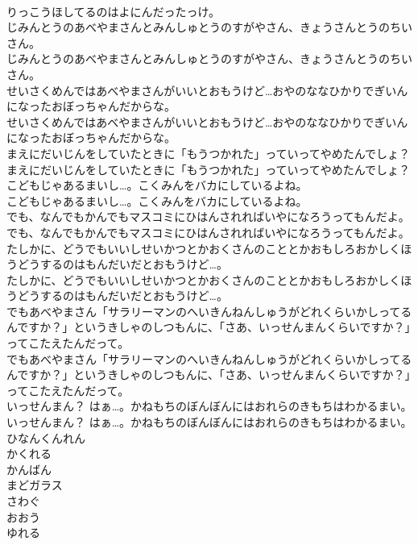 \documentclass[8pt]{extreport}
\begin{document}
\begin{CJK}{UTF8}{min}
\\	りっこうほしてるのはよにんだったっけ。
\\	じみんとうのあべやまさんとみんしゅとうのすがやさん、きょうさんとうのちいさん。
\\	じみんとうのあべやまさんとみんしゅとうのすがやさん、きょうさんとうのちいさん。
\\	せいさくめんではあべやまさんがいいとおもうけど…おやのななひかりでぎいんになったおぼっちゃんだからな。
\\	せいさくめんではあべやまさんがいいとおもうけど…おやのななひかりでぎいんになったおぼっちゃんだからな。
\\	まえにだいじんをしていたときに「もうつかれた」っていってやめたんでしょ？
\\	まえにだいじんをしていたときに「もうつかれた」っていってやめたんでしょ？
\\	こどもじゃあるまいし…。こくみんをバカにしているよね。
\\	こどもじゃあるまいし…。こくみんをバカにしているよね。
\\	でも、なんでもかんでもマスコミにひはんされればいやになろうってもんだよ。
\\	でも、なんでもかんでもマスコミにひはんされればいやになろうってもんだよ。
\\	たしかに、どうでもいいしせいかつとかおくさんのこととかおもしろおかしくほうどうするのはもんだいだとおもうけど…。
\\	たしかに、どうでもいいしせいかつとかおくさんのこととかおもしろおかしくほうどうするのはもんだいだとおもうけど…。
\\	でもあべやまさん「サラリーマンのへいきんねんしゅうがどれくらいかしってるんですか？」というきしゃのしつもんに、「さあ、いっせんまんくらいですか？」ってこたえたんだって。
\\	でもあべやまさん「サラリーマンのへいきんねんしゅうがどれくらいかしってるんですか？」というきしゃのしつもんに、「さあ、いっせんまんくらいですか？」ってこたえたんだって。
\\	いっせんまん？ はぁ…。かねもちのぼんぼんにはおれらのきもちはわかるまい。
\\	いっせんまん？ はぁ…。かねもちのぼんぼんにはおれらのきもちはわかるまい。
\\	ひなんくんれん
\\	かくれる
\\	かんばん
\\	まどガラス
\\	さわぐ
\\	おおう
\\	ゆれる

\end{CJK}
\end{document}
